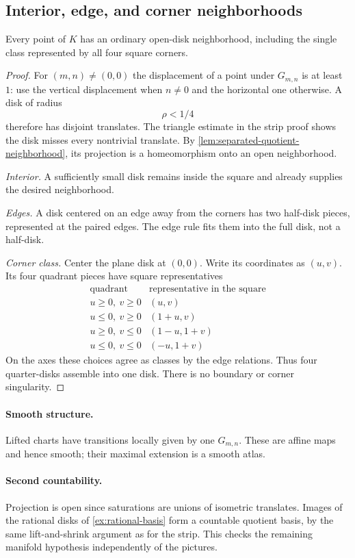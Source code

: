 \subsection{Interior, edge, and corner neighborhoods}
\begin{proposition}
Every point of $K$ has an ordinary open-disk neighborhood, including the
single class represented by all four square corners.
\end{proposition}
\begin{proof}
For $(m,n)\ne(0,0)$ the displacement of a point under $G_{m,n}$ is at
least $1$: use the vertical displacement when $n\ne0$ and the horizontal
one otherwise. A disk of radius
\[
\rho<1/4
\]
 therefore has disjoint translates.
The triangle estimate in the strip proof shows the disk misses every
nontrivial translate. By \cref{lem:separated-quotient-neighborhood}, its
projection is a homeomorphism onto an open neighborhood.

\emph{Interior.} A sufficiently small disk remains inside the square and
already supplies the desired neighborhood.

\emph{Edges.} A disk centered on an edge away from the corners has two
half-disk pieces, represented at the paired edges. The edge rule fits
them into the full disk, not a half-disk.

\emph{Corner class.} Center the plane disk at $(0,0)$. Write its coordinates
as $(u,v)$. Its four quadrant pieces have square representatives
\[
\begin{array}{c|c}
\text{quadrant}&\text{representative in the square}\\\hline
u\geq0,\ v\geq0&(u,v)\\
u\leq0,\ v\geq0&(1+u,v)\\
u\geq0,\ v\leq0&(1-u,1+v)\\
u\leq0,\ v\leq0&(-u,1+v)
\end{array}
\]
On the axes these choices agree as classes by the edge relations.
Thus four quarter-disks assemble into one disk. There is no boundary
or corner singularity.
\end{proof}

\FloatBarrier

\paragraph{Smooth structure.}
Lifted charts have transitions locally given by one $G_{m,n}$. These are
affine maps and hence smooth; their maximal extension is a smooth atlas.
\paragraph{Second countability.}
Projection is open since saturations are unions of isometric translates.
Images of the rational disks of \cref{ex:rational-basis} form a countable quotient basis,
by the same lift-and-shrink argument as for the strip. This checks the
remaining manifold hypothesis independently of the pictures.
